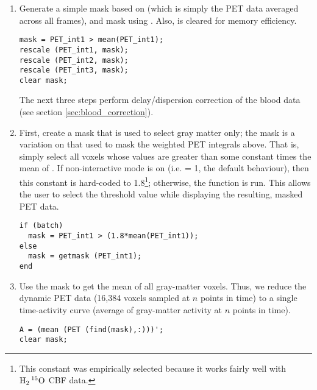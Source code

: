 \begin{enumerate}
  This uses , the CMEX version of , which has
  the useful feature of allowing a weighting function to be supplied.
  Thus, the first line of code above is equivalent to (but faster and
  less memory-intensive than)
  \begin{verbatim}
weight = ones (16384,1) * w1';
PETweighted = PET .* weight;
PET_int1 = trapz (MidFTimes, PETweighted');
  \end{verbatim}

\item Generate a simple mask based on  (which is
  simply the PET data averaged across all frames), and mask using
  .  Also,  is cleared for memory efficiency.
  \begin{verbatim}
mask = PET_int1 > mean(PET_int1);
rescale (PET_int1, mask);
rescale (PET_int2, mask);
rescale (PET_int3, mask);
clear mask;
  \end{verbatim}

  The next three steps perform delay/dispersion correction of the
  blood data (see section \ref{sec:blood_correction}).  


\item First, create a mask that is used to select gray matter only;
  the mask is a variation on that used to mask the weighted PET
  integrals above.  That is, simply select all voxels whose values are
  greater than some constant times the mean of .  If
  non-interactive mode is on (i.e.   = 1, the default
  behaviour), then this constant is hard-coded to 1.8\footnote{This
    constant was empirically selected because it works fairly well
    with ${\rm H_{2}\,^{15}O}$ CBF data.}; otherwise, the function
   is run.  This allows the user to select the threshold
  value while displaying the resulting, masked PET data.
  \begin{verbatim}
if (batch)
  mask = PET_int1 > (1.8*mean(PET_int1));
else
  mask = getmask (PET_int1);
end
  \end{verbatim}

\item Use the mask to get the mean of all gray-matter voxels.
  Thus, we reduce the dynamic PET data (16,384 voxels sampled at
  $n$ points in time) to a single time-activity curve (average of
  gray-matter activity at $n$ points in time).
  \begin{verbatim}
A = (mean (PET (find(mask),:)))';
clear mask;
  \end{verbatim}


\end{enumerate}
